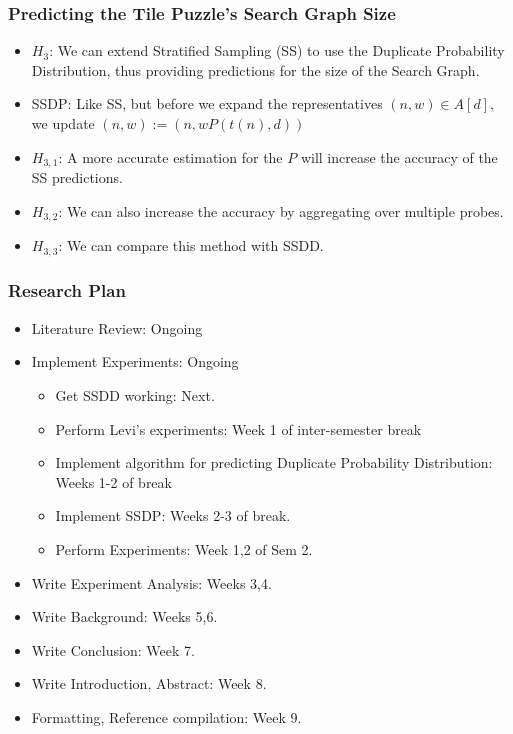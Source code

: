 \documentclass{beamer}
\begin{document}
\begin{frame}
  \frametitle{Predicting the Tile Puzzle's Search Graph Size}
  \begin{itemize}
  \item \(H_{3}\): We can extend Stratified Sampling (SS) to use the Duplicate Probability Distribution,
    thus providing predictions for the size of the Search Graph.
  \item SSDP: Like SS, but before we expand the representatives \((n,w) \in A[d]\),
    we update \((n,w) := (n, w P(t(n), d))\)
  \item \(H_{3,1}\): A more accurate estimation for the \(P\) will increase the accuracy of the SS predictions.
  \item \(H_{3,2}\): We can also increase the accuracy by aggregating over multiple probes.
  \item \(H_{3,3}\): We can compare this method with SSDD.
  \end{itemize}
\end{frame}

\begin{frame}
  \frametitle{Research Plan}
  \begin{itemize}
  \item Literature Review: Ongoing
  \item Implement Experiments: Ongoing
    \begin{itemize}
    \item Get SSDD working: Next.
    \item Perform Levi's experiments: Week 1 of inter-semester break
    \item Implement algorithm for predicting Duplicate Probability Distribution: Weeks 1-2 of break
    \item Implement SSDP: Weeks 2-3 of break.
    \item Perform Experiments: Week 1,2 of Sem 2.
    \end{itemize}
  \item Write Experiment Analysis: Weeks 3,4.
  \item Write Background: Weeks 5,6.
  \item Write Conclusion: Week 7.
  \item Write Introduction, Abstract: Week 8.
  \item Formatting, Reference compilation: Week 9.
  \end{itemize}
\end{frame}
\end{document}
